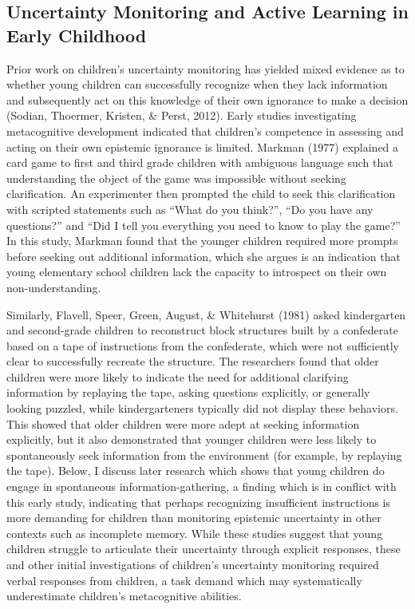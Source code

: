 \documentclass[floatsintext,man]{apa6}
\theoremstyle{definition}
\theoremstyle{definition}
\theoremstyle{definition}
\theoremstyle{remark}
\begin{document}
\subsection{Uncertainty Monitoring and Active Learning in Early
Childhood}\label{uncertainty-monitoring-and-active-learning-in-early-childhood}

Prior work on children's uncertainty monitoring has yielded mixed
evidence as to whether young children can successfully recognize when
they lack information and subsequently act on this knowledge of their
own ignorance to make a decision (Sodian, Thoermer, Kristen, \& Perst,
2012). Early studies investigating metacognitive development indicated
that children's competence in assessing and acting on their own
epistemic ignorance is limited. Markman (1977) explained a card game to
first and third grade children with ambiguous language such that
understanding the object of the game was impossible without seeking
clarification. An experimenter then prompted the child to seek this
clarification with scripted statements such as \enquote{What do you
think?}, \enquote{Do you have any questions?} and \enquote{Did I tell
you everything you need to know to play the game?} In this study,
Markman found that the younger children required more prompts before
seeking out additional information, which she argues is an indication
that young elementary school children lack the capacity to introspect on
their own non-understanding.

Similarly, Flavell, Speer, Green, August, \& Whitehurst (1981) asked
kindergarten and second-grade children to reconstruct block structures
built by a confederate based on a tape of instructions from the
confederate, which were not sufficiently clear to successfully recreate
the structure. The researchers found that older children were more
likely to indicate the need for additional clarifying information by
replaying the tape, asking questions explicitly, or generally looking
puzzled, while kindergarteners typically did not display these
behaviors. This showed that older children were more adept at seeking
information explicitly, but it also demonstrated that younger children
were less likely to spontaneously seek information from the environment
(for example, by replaying the tape). Below, I discuss later research
which shows that young children do engage in spontaneous
information-gathering, a finding which is in conflict with this early
study, indicating that perhaps recognizing insufficient instructions is
more demanding for children than monitoring epistemic uncertainty in
other contexts such as incomplete memory. While these studies suggest
that young children struggle to articulate their uncertainty through
explicit responses, these and other initial investigations of children's
uncertainty monitoring required verbal responses from children, a task
demand which may systematically underestimate children's metacognitive
abilities.
\end{document}
